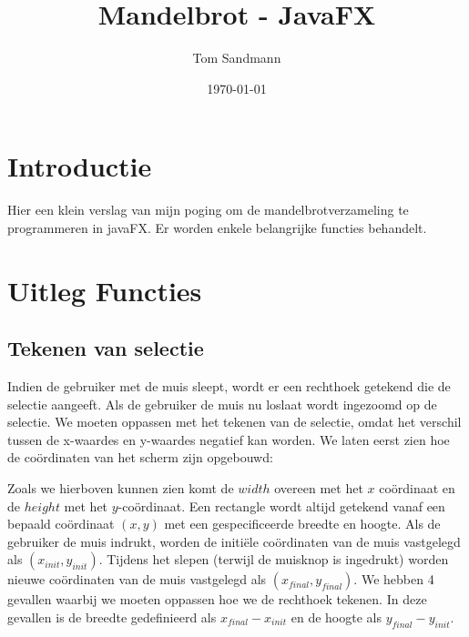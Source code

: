 \documentclass[hidelinks, dutch]{article}
\title{Mandelbrot - JavaFX}
\author{Tom Sandmann}
\date{\today}
\begin{document}
\maketitle
\lstset{language=Java}
\tableofcontents

\section{Introductie}
Hier een klein verslag van mijn poging om de mandelbrotverzameling te programmeren in javaFX. Er worden enkele belangrijke functies behandelt.

\section{Uitleg Functies}
\subsection{Tekenen van selectie}
Indien de gebruiker met de muis sleept, wordt er een rechthoek getekend die de selectie aangeeft. Als de gebruiker de muis nu loslaat wordt ingezoomd op de selectie. We moeten oppassen met het tekenen van de selectie, omdat het verschil tussen de x-waardes en y-waardes negatief kan worden. We laten eerst zien hoe de coördinaten van het scherm zijn opgebouwd:
\begin{center}
\end{center}
Zoals we hierboven kunnen zien komt de $width$ overeen met het $x$ coördinaat en de $height$ met het $y$-coördinaat. Een rectangle wordt altijd getekend vanaf een bepaald coördinaat $(x,y)$ met een gespecificeerde breedte en hoogte. Als de gebruiker de muis indrukt, worden de initiële coördinaten van de muis vastgelegd als $(x_{init},y_{init})$. Tijdens het slepen (terwijl de muisknop is ingedrukt) worden nieuwe coördinaten van de muis vastgelegd als $(x_{final},y_{final})$. We hebben 4 gevallen waarbij we moeten oppassen hoe we de rechthoek tekenen. In deze gevallen is de breedte gedefinieerd als $x_{final}-x_{init}$ en de hoogte als $y_{final}-y_{init}$.
\end{document}

